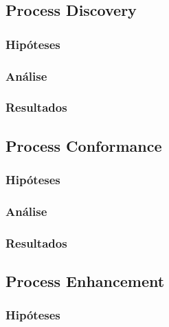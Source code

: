 \documentclass[a4paper]{article}
\begin{document}
\cite{PM_book}
\lipsum[10]
\lipsum[10]
\lipsum[10]

\subsection{Process Discovery}

\lipsum[10]

\subsubsection{Hipóteses}
\lipsum[10]
\lipsum[10]
\lipsum[10]
\lipsum[10]
\subsubsection{Análise}
\lipsum[10]
\lipsum[10]
\lipsum[10]
\lipsum[10]
\lipsum[10]
\lipsum[10]
\subsubsection{Resultados}
\lipsum[10]
\lipsum[10]
\lipsum[10]
\lipsum[10]

\subsection{Process Conformance}

\lipsum[10]

\subsubsection{Hipóteses}
\lipsum[10]
\lipsum[10]
\lipsum[10]
\lipsum[10]
\subsubsection{Análise}
\lipsum[10]
\lipsum[10]
\lipsum[10]
\lipsum[10]
\subsubsection{Resultados}
\lipsum[10]
\lipsum[10]
\lipsum[10]
\lipsum[10]

\subsection{Process Enhancement}

\lipsum[10]

\subsubsection{Hipóteses}
\lipsum[10]
\lipsum[10]
\lipsum[10]
\lipsum[10]
\end{document}
